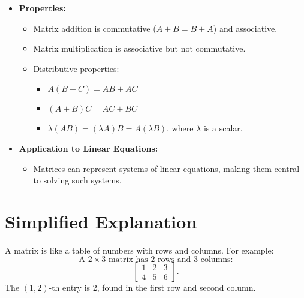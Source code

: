 \documentclass{article}
\begin{document}
\begin{itemize}
  \item \textbf{Properties:}
    \begin{itemize}
      \item Matrix addition is commutative ($A + B = B + A$) and associative.
      \item Matrix multiplication is associative but not commutative.
      \item Distributive properties:
        \begin{itemize}
          \item $A(B + C) = AB + AC$
          \item $(A + B)C = AC + BC$
          \item $\lambda(AB) = (\lambda A)B = A(\lambda B)$, where $\lambda$ is a scalar.
        \end{itemize}
    \end{itemize}

  \item \textbf{Application to Linear Equations:}
    \begin{itemize}
      \item Matrices can represent systems of linear equations, making them central to solving such systems.
    \end{itemize}
\end{itemize}

\section*{Simplified Explanation}

A matrix is like a table of numbers with rows and columns. For example:
\[
  \text{A } 2 \times 3 \text{ matrix has 2 rows and 3 columns:}
\]
\[
  \begin{bmatrix}
    1 & 2 & 3 \\
    4 & 5 & 6
  \end{bmatrix}.
\]
The $(1, 2)$-th entry is 2, found in the first row and second column.
\end{document}
